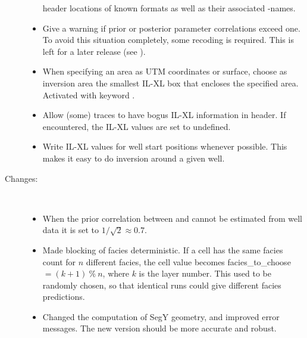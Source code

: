 \begin{description}
\begin{itemize}
      header locations of known formats as well as their associated
      \crava-names. 
    \item Give a warning if prior or posterior parameter correlations
      exceed one. To avoid this situation completely, some recoding is
      required. This is left for a later release (see
      ). 
    \item When specifying an area as UTM coordinates or surface,
      choose as inversion area the smallest IL-XL box that
      encloses the specified area. Activated with keyword
      . 
    \item Allow (some) traces to have bogus IL-XL information in
      header. If encountered, the IL-XL values are set to
      undefined. 
    \item Write IL-XL values for well start positions whenever
      possible. This makes it easy to do inversion around a given
      well. 
 \end{itemize}

\item [Changes:] \mbox{ }
  \begin{itemize}
    \item When the prior correlation between \vp and \vs cannot be
      estimated from well data it is set to $1/\sqrt{2}\approx
      0.7$. 
    \item Made blocking of facies deterministic. If a cell has the
      same facies count for $n$ different facies, the cell value
      becomes facies\_to\_choose $= (k + 1)\ \%\ n$, where $k$ is the
      layer number. This used to be randomly chosen, so that identical
      runs could give different facies predictions. 
    \item Changed the computation of SegY geometry, and improved error messages. The new version should be more accurate and robust.
  \end{itemize}


\end{description}
